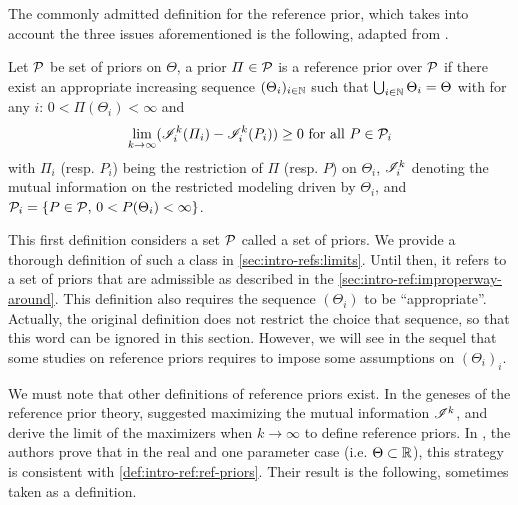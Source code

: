 The commonly admitted definition for the reference prior, which takes into account the three issues aforementioned is the following, adapted from \cite{dey_reference_2005}.
\begin{defi}\label{def:intro-ref:ref-priors}
    Let $\mathcal{P}$ be set of priors on $\Theta$, a prior $\varPi\in\mathcal{P}$ %
    is a reference prior over $\mathcal{P}$ if there exist an appropriate increasing sequence $(\Theta_i)_{i\in\mathbb{N}}$ such that $\bigcup_{i\in\mathbb{N}}\Theta_i=\Theta$ with for any $i$: $0<\varPi(\Theta_i)<\infty  $ and
        \begin{equation}
            \lim_{k\rightarrow\infty} (\mathscr{I}^k_i(\varPi_i) - \mathscr{I}^k_i(P_i) )\geq 0 \text{\ for all\ } P\in\mathcal{P}_i
        \end{equation}
    with $\varPi_i$ (resp. $P_i$) being the restriction of $\varPi$ (resp. $P$) on $\Theta_i$, $\mathscr{I}_i^k$ denoting the mutual information on the restricted modeling driven by $\Theta_i$, and $\mathcal{P}_i=\{P\in\mathcal{P},\,0<P(\Theta_i)<\infty\}$.
\end{defi}

This first definition considers a set $\mathcal{P}$ called a set of priors. 
We provide a thorough definition of such a class in \cref{sec:intro-refs:limits}.
Until then, it refers to a set of priors that are admissible as described in the \cref{sec:intro-ref:improperway-around}.
This definition also
requires the sequence $(\Theta_i)$ to be ``appropriate''.
Actually,  the original definition does not restrict the choice that sequence, so that this word can be ignored in this section.
However, we will see in the sequel that some studies on reference priors requires to impose some assumptions on $(\Theta_i)_i$. 





We must note that other definitions of reference priors exist.
In the geneses of the reference prior theory, \citet{bernardo_reference_1979} suggested maximizing the mutual information $\mathscr{I}^k$, and derive the limit of the maximizers when $k\to\infty$ to define reference priors.
In \cite{berger_formal_2009}, the authors prove that in the real and one parameter case (i.e. $\Theta\subset\mathbb{R}$), this strategy is consistent with \cref{def:intro-ref:ref-priors}. Their result is the following, sometimes taken as a definition.


